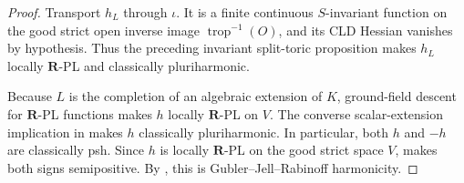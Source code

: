 
\begin{proof}
Transport \(h_L\) through \(\iota\).  It is a finite continuous
\(S\)-invariant function on the good strict open inverse image
\(\operatorname{trop}^{-1}(O)\), and its CLD Hessian vanishes by hypothesis.
Thus the preceding invariant split-toric proposition makes \(h_L\) locally
\(\mathbf R\)-PL and classically pluriharmonic.

Because \(L\) is the completion of an algebraic extension of \(K\),
ground-field descent for \(\mathbf R\)-PL functions
\cite[Corollary~5.12]{GJR26} makes \(h\) locally \(\mathbf R\)-PL on
\(V\).  The converse scalar-extension implication in
\cite[Proposition~7.2(6)]{GR25Classical} makes \(h\) classically
pluriharmonic.  In particular, both \(h\) and \(-h\) are classically psh.
Since \(h\) is locally \(\mathbf R\)-PL on the good strict space \(V\),
\cite[Theorem~4.3]{GR25Classical} makes both signs semipositive.  By
\cite[Definition~7.2]{GJR26}, this is Gubler--Jell--Rabinoff harmonicity.
\end{proof}
